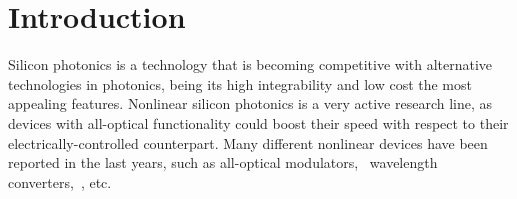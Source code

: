 \documentclass[10pt,letterpaper]{article}
\begin{document}







\section{Introduction}

Silicon photonics is a technology that is becoming competitive with alternative technologies in photonics, being its high integrability and low cost the most appealing features. Nonlinear silicon photonics is a very active research line, as devices with all-optical functionality could boost their speed with respect to their electrically-controlled counterpart. Many different nonlinear devices have been reported in the last years, such as all-optical modulators,~\cite{Almeida2004a} wavelength converters,~\cite{Lee2009}, etc. \cite{Matres:12}

\end{document}
